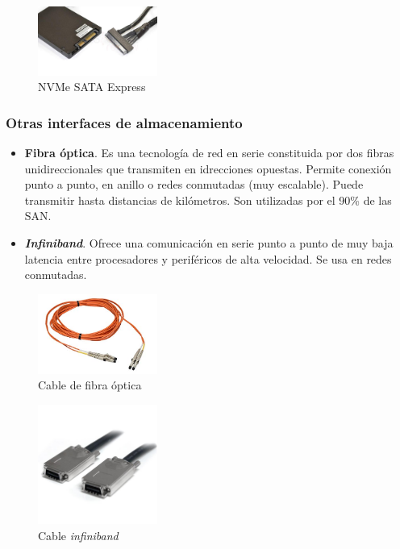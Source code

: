 \documentclass[12pt,spanish]{article}
\begin{document}
\begin{figure}[H]
	\centering
	\includegraphics[width=0.35\textwidth]{satae.jpg}
	\caption{NVMe SATA Express}
\end{figure}

\subsubsection{Otras interfaces de almacenamiento}

\begin{itemize}
	\item \textbf{Fibra óptica}. Es una tecnología de red en serie constituida por dos fibras unidireccionales que transmiten en idrecciones opuestas. Permite conexión punto a punto, en anillo o redes conmutadas (muy escalable). Puede transmitir hasta distancias de kilómetros. Son utilizadas por el 90\% de las SAN.
	\item \textit{\textbf{Infiniband}}. Ofrece una comunicación en serie punto a punto de muy baja latencia entre procesadores y periféricos de alta velocidad. Se usa en redes conmutadas.
\end{itemize}

\begin{figure}[H]
	\centering
	\includegraphics[width=0.35\textwidth]{fccable.jpg}
	\caption{Cable de fibra óptica}
\end{figure}

\begin{figure}[H]
	\centering
	\includegraphics[width=0.35\textwidth]{infiniband.jpeg}
	\caption{Cable \textit{infiniband}}
\end{figure}
\end{document}
